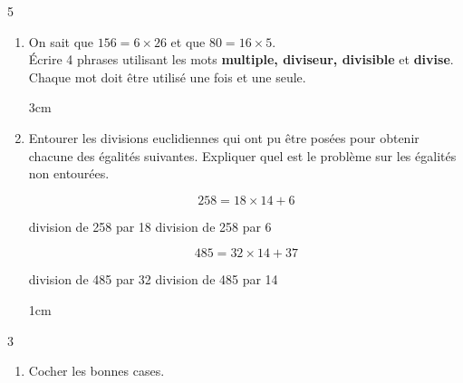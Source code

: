 \documentclass[a4paper]{book}
\begin{document}
{\begin{exerciceNote}{5}
\begin{enumerate}[leftmargin=*]
\begin{itemize}
                \medskip
                
                \item Un nombre entier est divisible par 9 si \dotfill

                \medskip

                \dotfill
            \end{itemize}

            \item On sait que $156=6\times26$ et que $80=16\times5$. \\
            Écrire 4 phrases utilisant les mots \textbf{multiple, diviseur, divisible} et \textbf{divise}. Chaque mot doit être utilisé une fois et une seule.

            \begin{ZoneReponse}{3cm}
            \end{ZoneReponse}

            \item Entourer les divisions euclidiennes qui ont pu être posées pour obtenir chacune des égalités suivantes. Expliquer quel est le problème sur les égalités non entourées.

            \begin{minipage}{0.45\linewidth}
                \[258 = 18 \times 14 + 6\]

                \begin{center}
                    division de 258 par 18 \quad \quad division de 258 par 6
                \end{center}
            \end{minipage}
            \hfill \vline \hfill
            \begin{minipage}{0.45\linewidth}
                \[485 = 32 \times 14 + 37\]

                division de 485 par 32 \quad \quad division de 485 par 14
            \end{minipage} 

            \begin{ZoneReponse}{1cm}
            \end{ZoneReponse}
        \end{enumerate}
    \end{exerciceNote}


\newpage


    \begin{exerciceNote}{3}
        \begin{enumerate}[leftmargin=*]
            \item Cocher les bonnes cases.
            

\end{enumerate}
\end{exerciceNote}}
\end{document}
